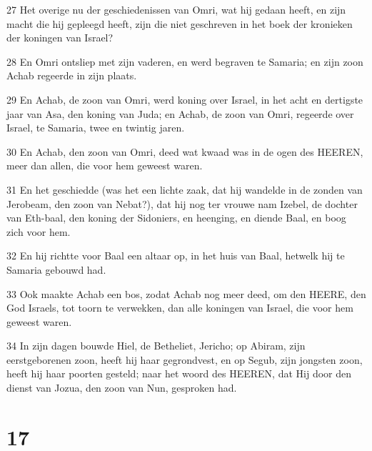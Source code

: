 \par 27 Het overige nu der geschiedenissen van Omri, wat hij gedaan heeft, en zijn macht die hij gepleegd heeft, zijn die niet geschreven in het boek der kronieken der koningen van Israel?
\par 28 En Omri ontsliep met zijn vaderen, en werd begraven te Samaria; en zijn zoon Achab regeerde in zijn plaats.
\par 29 En Achab, de zoon van Omri, werd koning over Israel, in het acht en dertigste jaar van Asa, den koning van Juda; en Achab, de zoon van Omri, regeerde over Israel, te Samaria, twee en twintig jaren.
\par 30 En Achab, den zoon van Omri, deed wat kwaad was in de ogen des HEEREN, meer dan allen, die voor hem geweest waren.
\par 31 En het geschiedde (was het een lichte zaak, dat hij wandelde in de zonden van Jerobeam, den zoon van Nebat?), dat hij nog ter vrouwe nam Izebel, de dochter van Eth-baal, den koning der Sidoniers, en heenging, en diende Baal, en boog zich voor hem.
\par 32 En hij richtte voor Baal een altaar op, in het huis van Baal, hetwelk hij te Samaria gebouwd had.
\par 33 Ook maakte Achab een bos, zodat Achab nog meer deed, om den HEERE, den God Israels, tot toorn te verwekken, dan alle koningen van Israel, die voor hem geweest waren.
\par 34 In zijn dagen bouwde Hiel, de Betheliet, Jericho; op Abiram, zijn eerstgeborenen zoon, heeft hij haar gegrondvest, en op Segub, zijn jongsten zoon, heeft hij haar poorten gesteld; naar het woord des HEEREN, dat Hij door den dienst van Jozua, den zoon van Nun, gesproken had.

\chapter{17}

